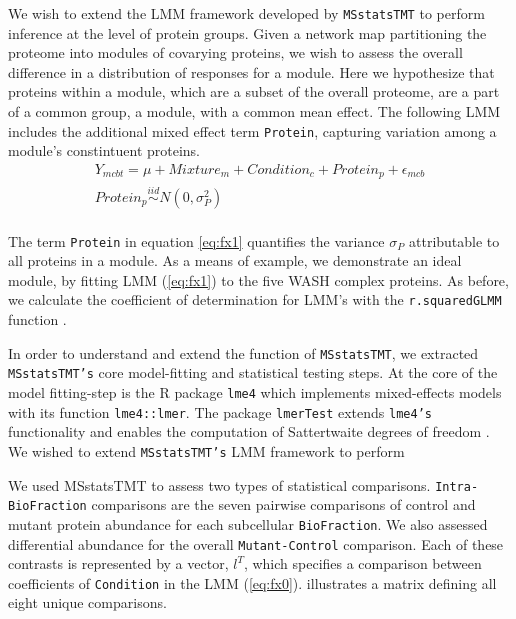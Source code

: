 \documentclass[11pt]{elife}\usepackage[]{graphicx}\usepackage[]{color}
\begin{document}
We wish to extend the LMM framework developed by \texttt{MSstatsTMT} to perform 
inference at the level of protein groups. Given a network map
partitioning the proteome into modules of covarying proteins, we wish to assess
the overall difference in a distribution of responses for a module. 
Here we hypothesize that proteins within a module, which are a subset of the
overall proteome,  are a part of a common group, a module, with a common mean
effect. The following LMM includes the additional mixed effect term
\texttt{Protein}, capturing variation among a module's constintuent proteins.
\begin{equation} 
  \begin{gathered}\label{eq:fx1} %
	Y_{mcbt} = \mu + Mixture_m + Condition_c + Protein_p + \epsilon_{mcb}\\
	Protein_p \stackrel{iid}{\sim} N(0,\sigma^2_P) \\
  \end{gathered}
\end{equation}

The term \texttt{Protein} in equation \ref{eq:fx1} quantifies the variance
$\sigma_P$ attributable to all proteins in a module.  As a means of example, we
demonstrate an ideal module, by fitting LMM (\ref{eq:fx1}) to the five WASH
complex proteins.  As before, we calculate the coefficient of determination for
LMM's with the \texttt{r.squaredGLMM} function \citep{WangMerkle2018}.

In order to understand and extend the function of \texttt{MSstatsTMT}, we
extracted \texttt{MSstatsTMT's} core model-fitting and statistical testing
steps.  At the core of the model fitting-step is the R package \texttt{lme4}
which implements mixed-effects models with its function
\texttt{lme4::lmer}\citep{Bates2015}. The package \texttt{lmerTest} extends
\texttt{lme4's} functionality and enables the computation of Sattertwaite
degrees of freedom \citep{Kuznetsova2017}. 
We  wished to extend \texttt{MSstatsTMT's} LMM framework to perform

We used MSstatsTMT to assess two types of statistical comparisons. 
\texttt{Intra-BioFraction} comparisons are the seven pairwise comparisons of 
control and mutant protein abundance for each subcellular
\texttt{BioFraction}. We also assessed differential abundance for the 
overall \texttt{Mutant-Control} comparison. Each of these contrasts is 
represented by a vector, $l^T$, which specifies a comparison between 
coefficients of \texttt{Condition} in the LMM (\ref{eq:fx0}).
 illustrates a matrix defining all eight unique comparisons.
\end{document}
